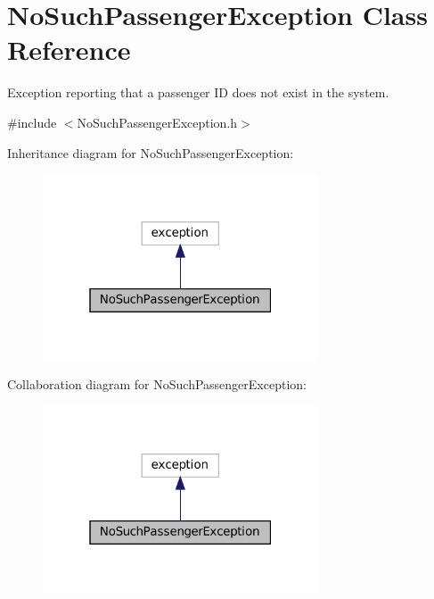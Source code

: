 \hypertarget{classNoSuchPassengerException}{}\section{No\+Such\+Passenger\+Exception Class Reference}
\label{classNoSuchPassengerException}


Exception reporting that a passenger ID does not exist in the system.  




{\ttfamily \#include $<$No\+Such\+Passenger\+Exception.\+h$>$}



Inheritance diagram for No\+Such\+Passenger\+Exception\+:
\nopagebreak
\begin{figure}[H]
\begin{center}
\leavevmode
\includegraphics[width=232pt]{classNoSuchPassengerException__inherit__graph}
\end{center}
\end{figure}


Collaboration diagram for No\+Such\+Passenger\+Exception\+:
\nopagebreak
\begin{figure}[H]
\begin{center}
\leavevmode
\includegraphics[width=232pt]{classNoSuchPassengerException__coll__graph}
\end{center}
\end{figure}
